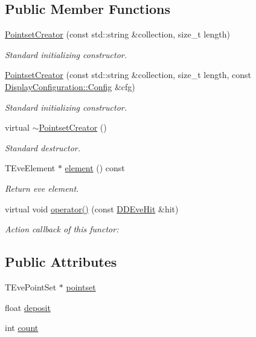 \subsection*{Public Member Functions}
\begin{DoxyCompactItemize}
\item 
\hyperlink{struct_d_d4hep_1_1_pointset_creator_abe227e7b97ff9fdca5a8251994a301df}{Pointset\+Creator} (const std\+::string \&collection, size\+\_\+t length)
\begin{DoxyCompactList}\small\item\em Standard initializing constructor. \end{DoxyCompactList}\item 
\hyperlink{struct_d_d4hep_1_1_pointset_creator_af9e8ec4b156dce9ac15a0a0ee1214176}{Pointset\+Creator} (const std\+::string \&collection, size\+\_\+t length, const \hyperlink{class_d_d4hep_1_1_display_configuration_1_1_config}{Display\+Configuration\+::\+Config} \&cfg)
\begin{DoxyCompactList}\small\item\em Standard initializing constructor. \end{DoxyCompactList}\item 
virtual \hyperlink{struct_d_d4hep_1_1_pointset_creator_a11cafd713490e23770130fa3f3c687bc}{$\sim$\+Pointset\+Creator} ()
\begin{DoxyCompactList}\small\item\em Standard destructor. \end{DoxyCompactList}\item 
T\+Eve\+Element $\ast$ \hyperlink{struct_d_d4hep_1_1_pointset_creator_a543467a3fc5f0c6779072483c48ca38b}{element} () const
\begin{DoxyCompactList}\small\item\em Return eve element. \end{DoxyCompactList}\item 
virtual void \hyperlink{struct_d_d4hep_1_1_pointset_creator_ac17113e2952d438023d2b9d6a31d6e36}{operator()} (const \hyperlink{class_d_d4hep_1_1_d_d_eve_hit}{D\+D\+Eve\+Hit} \&hit)
\begin{DoxyCompactList}\small\item\em Action callback of this functor\+: \end{DoxyCompactList}\end{DoxyCompactItemize}
\subsection*{Public Attributes}
\begin{DoxyCompactItemize}
\item 
T\+Eve\+Point\+Set $\ast$ \hyperlink{struct_d_d4hep_1_1_pointset_creator_a59f3e1be9bcdc98a6d94a0c1dbee10bd}{pointset}
\item 
float \hyperlink{struct_d_d4hep_1_1_pointset_creator_a6caa5f448ed788b5ff8bcac223b6e5a8}{deposit}
\item 
int \hyperlink{struct_d_d4hep_1_1_pointset_creator_a190788682e1cb43e03549f1a03377502}{count}
\end{DoxyCompactItemize}


